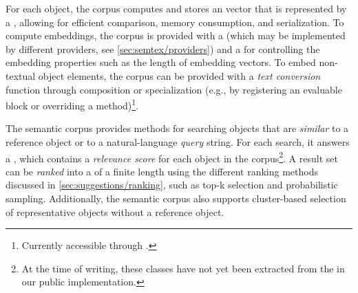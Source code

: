 For each object, the corpus computes and stores an  vector that is represented by a , allowing for efficient comparison, memory consumption, and serialization.
To compute embeddings, the corpus is provided with a  (which may be implemented by different providers, see \cref{sec:semtex/providers}) and a  for controlling the embedding properties such as the length of embedding vectors.
To embed non-textual object elements, the corpus can be provided with a \emph{text conversion} function through composition or specialization (e.g., by registering an evaluable block or overriding a method)\footnote{Currently accessible through .}.

The semantic corpus provides methods for searching objects that are \emph{similar} to a reference object or to a natural-language \emph{query} string.
For each search, it answers a , which contains a \emph{relevance score} for each object in the corpus\footnote{At the time of writing, these classes have not yet been extracted from the  in our public implementation.}.
A result set can be \emph{ranked} into a  of a finite length using the different ranking methods discussed in \cref{sec:suggestions/ranking}, such as top-k selection and probabilistic sampling.
Additionally, the semantic corpus also supports cluster-based selection of representative objects without a reference object.

